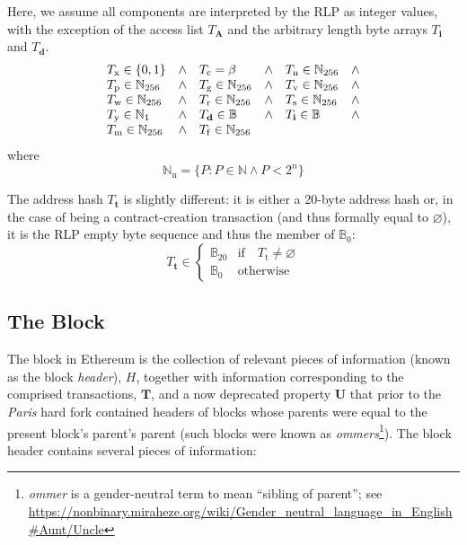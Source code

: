 \documentclass[9pt,oneside]{amsart}
\makeatletter
\newcommand{\linkdest}[1]{\Hy@raisedlink{\hypertarget{#1}{}}}
\makeatother
\begin{document}
\begin{multicols}{2}
Here, we assume all components are interpreted by the RLP as integer values, with the exception of the access list $T_{\mathbf{A}}$ and the arbitrary length byte arrays $T_{\mathbf{i}}$ and $T_{\mathbf{d}}$.
\begin{equation}
\begin{array}[t]{lclclc}
T_{\mathrm{x}} \in \{0, 1\} & \wedge & T_{\mathrm{c}} = \beta & \wedge & T_{\mathrm{n}} \in \mathbb{N}_{256} & \wedge \\
T_{\mathrm{p}} \in \mathbb{N}_{256} & \wedge & T_{\mathrm{g}} \in \mathbb{N}_{256} & \wedge & T_{\mathrm{v}} \in \mathbb{N}_{256} & \wedge \\
T_{\mathrm{w}} \in \mathbb{N}_{256} & \wedge & T_{\mathrm{r}} \in \mathbb{N}_{256} & \wedge & T_{\mathrm{s}} \in \mathbb{N}_{256} & \wedge \\
T_{\mathrm{y}} \in \mathbb{N}_{1} & \wedge & T_{\mathbf{d}} \in \mathbb{B} & \wedge & T_{\mathbf{i}} \in \mathbb{B} & \wedge \\
T_{\mathrm{m}} \in \mathbb{N}_{256} & \wedge & T_{\mathrm{f}} \in \mathbb{N}_{256}
\end{array}
\end{equation}
where
\begin{equation}
\mathbb{N}_{\mathrm{n}} = \{ P: P \in \mathbb{N} \wedge P < 2^n \}
\end{equation}

The address hash $T_{\mathbf{t}}$ is slightly different: it is either a 20-byte address hash or, in the case of being a contract-creation transaction (and thus formally equal to $\varnothing$), it is the RLP empty byte sequence and thus the member of $\mathbb{B}_0$:
\begin{equation}
T_{\mathbf{t}} \in \begin{cases} \mathbb{B}_{20} & \text{if} \quad T_{\mathrm{t}} \neq \varnothing \\
\mathbb{B}_{0} & \text{otherwise}\end{cases}
\end{equation}

\subsection{The Block}\linkdest{block}\label{subsec:The_Block}

The block in Ethereum is the collection of relevant pieces of information (known as the block \textit{header}), $H$, together with information corresponding to the comprised transactions, $\mathbf{T}$,\hypertarget{ommerheaders}{} and a now deprecated property $\mathbf{U}$ that prior to the \textit{Paris} hard fork contained headers of blocks whose parents were equal to the present block's parent's parent (such blocks were known as \textit{ommers}\footnote{\textit{ommer} is a gender-neutral term to mean ``sibling of parent''; see \url{https://nonbinary.miraheze.org/wiki/Gender_neutral_language_in_English\#Aunt/Uncle}}). The block header contains several pieces of information:


\end{multicols}
\end{document}
